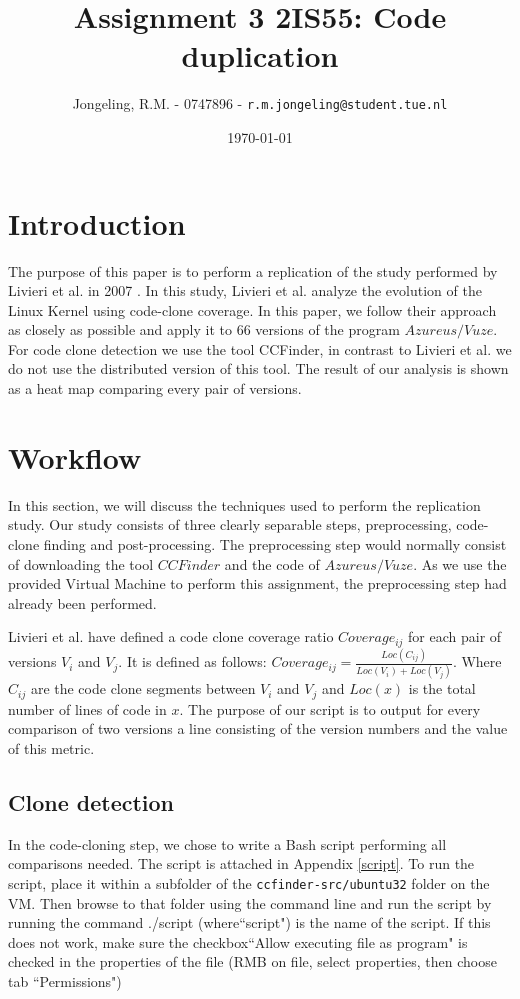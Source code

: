 \documentclass[a4paper,twoside, twocolumn, 11pt]{article}
\title{\vspace{-\baselineskip}\sffamily\bfseries Assignment 3 2IS55: Code duplication}
\author{Jongeling, R.M. - 0747896 - {\tt r.m.jongeling@student.tue.nl}}
\date{\today}
\numberwithin{equation}{section}
\begin{document}
\maketitle

\begin{abstract}

\end{abstract}

\section{Introduction}
The purpose of this paper is to perform a replication of the study performed by Livieri et al. in 2007 \cite{paper}.
In this study, Livieri et al. analyze the evolution of the Linux Kernel using code-clone coverage.
In this paper, we follow their approach as closely as possible and apply it to 66 versions of the program $Azureus/Vuze$.
For code clone detection we use the tool CCFinder, in contrast to Livieri et al. we do not use the distributed version of this tool.
The result of our analysis is shown as a heat map comparing every pair of versions.


\section{Workflow}
In this section, we will discuss the techniques used to perform the replication study.
Our study consists of three clearly separable steps, preprocessing, code-clone finding and post-processing.
The preprocessing step would normally consist of downloading the tool $CCFinder$ and the code of $Azureus/Vuze$.
As we use the provided Virtual Machine to perform this assignment, the preprocessing step had already been performed.

Livieri et al. have defined a code clone coverage ratio $Coverage_{ij}$ for each pair of versions $V_i$ and $V_j$. 
It is defined as follows: $Coverage_{ij} = \frac{Loc(C_{ij})}{Loc(V_i) + Loc(V_j)}$.
Where $C_{ij}$ are the code clone segments between $V_i$ and $V_j$ and $Loc(x)$ is the total number of lines of code in $x$.
The purpose of our script is to output for every comparison of two versions a line consisting of the version numbers and the value of this metric.

\subsection{Clone detection}
In the code-cloning step, we chose to write a Bash script performing all comparisons needed.
The script is attached in Appendix \ref{script}.
To run the script, place it within a subfolder of the \texttt{ccfinder-src/ubuntu32} folder on the VM. 
Then browse to that folder using the command line and run the script by running the command ./script (where``script") is the name of the script.
If this does not work, make sure the checkbox``Allow executing file as program" is checked in the properties of the file (RMB on file, select properties, then choose tab ``Permissions")
\end{document}

